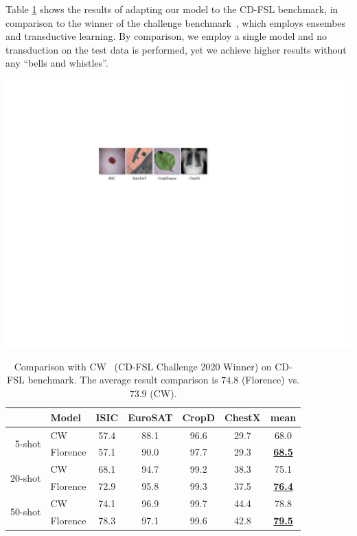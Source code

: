 \documentclass{article}
\begin{document}
Table \ref{tab:cdfsl} shows the results of adapting our model to the CD-FSL benchmark, in comparison to the winner of the challenge benchmark~\cite{cdfsltop}, which employs ensembes and transductive learning. By comparison, we employ a single model and no transduction on the test data is performed, yet we achieve higher results without any ``bells and whistles''.

\begin{table}[t]
\centering
\begin{minipage}[t]{1.0\linewidth}
  \centering
\includegraphics[width=1.0\linewidth]{figure/CD_DSL.pdf}
\end{minipage}\vspace{0.3em}
\setlength{\tabcolsep}{3.8pt}
\small
\renewcommand{\arraystretch}{1.35}
\begin{tabular}{r|l|cccc|c}
\toprule
 & Model & ISIC & EuroSAT & CropD & ChestX & mean \\ \midrule
\multirow{2}{*}{5-shot} & CW & 57.4 & 88.1 & 96.6 & 29.7 & 68.0 \\
 & Florence & 57.1 & 90.0 & 97.7 & 29.3 & \underline{\bf{68.5}} \\ \midrule
\multirow{2}{*}{20-shot} & CW & 68.1 & 94.7 & 99.2 & 38.3 & 75.1 \\
 & Florence & 72.9 & 95.8 & 99.3 & 37.5 & \underline{\bf{76.4}} \\ \midrule
\multirow{2}{*}{50-shot} & CW & 74.1 & 96.9 & 99.7 & 44.4 & 78.8 \\
 & Florence & 78.3 & 97.1 & 99.6 & 42.8 & \underline{\bf{79.5}} \\ \bottomrule
\end{tabular}
\caption{Comparison with CW~\cite{cdfsltop} (CD-FSL Challenge 2020 Winner) on CD-FSL benchmark. The average result comparison is $74.8$ (Florence) vs. $73.9$ (CW).}
\label{tab:cdfsl}
\end{table}
\end{document}
